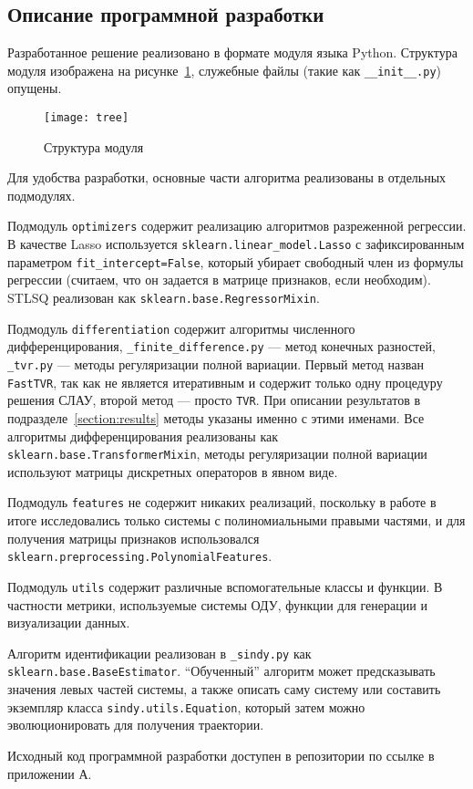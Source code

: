 \subsection{Описание программной разработки}
\label{section:practice}

Разработанное решение реализовано в формате модуля языка Python. Структура модуля изображена на рисунке~\ref{fig:tree}, служебные файлы (такие как \texttt{\_\_init\_\_.py}) опущены.

\begin{figure}
\texttt{[image: tree]}
\caption{Структура модуля}
\label{fig:tree}
\end{figure}

Для удобства разработки, основные части алгоритма реализованы в отдельных подмодулях.

Подмодуль \texttt{optimizers} содержит реализацию алгоритмов разреженной регрессии. В качестве Lasso используется \texttt{sklearn.linear\_model.Lasso} с зафиксированным параметром \texttt{fit\_intercept=False}, который убирает свободный член из формулы регрессии (считаем, что он задается в матрице признаков, если необходим). STLSQ реализован как \texttt{sklearn.base.RegressorMixin}.

Подмодуль \texttt{differentiation} содержит алгоритмы численного дифференцирования, \texttt{\_finite\_difference.py} --- метод конечных разностей, \texttt{\_tvr.py} --- методы регуляризации полной вариации. Первый метод назван \texttt{FastTVR}, так как не является итеративным и содержит только одну процедуру решения СЛАУ, второй метод --- просто \texttt{TVR}. При описании результатов в подразделе~\ref{section:results} методы указаны именно с этими именами. Все алгоритмы дифференцирования реализованы как \texttt{sklearn.base.TransformerMixin}, методы регуляризации полной вариации используют матрицы дискретных операторов в явном виде.

Подмодуль \texttt{features} не содержит никаких реализаций, поскольку в работе в итоге исследовались только системы с полиномиальными правыми частями, и для получения матрицы признаков использовался \texttt{sklearn.preprocessing.PolynomialFeatures}.

Подмодуль \texttt{utils} содержит различные вспомогательные классы и функции. В частности метрики, используемые системы ОДУ, функции для генерации и визуализации данных.

Алгоритм идентификации реализован в \texttt{\_sindy.py} как \texttt{sklearn.base.BaseEstimator}. \enquote{Обученный} алгоритм может предсказывать значения левых частей системы, а также описать саму систему или составить экземпляр класса \texttt{sindy.utils.Equation}, который затем можно эволюционировать для получения траектории.

Исходный код программной разработки доступен в репозитории по ссылке в приложении А.
